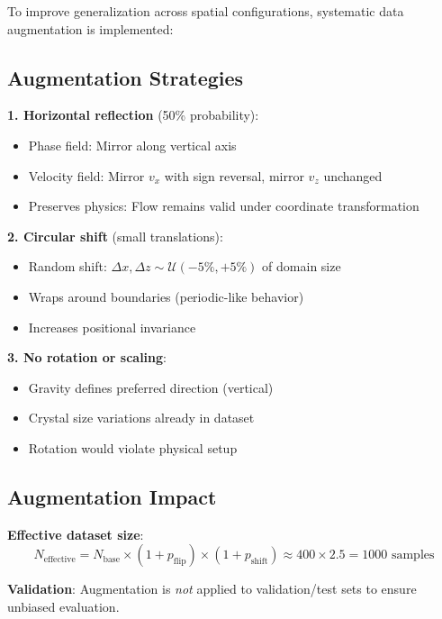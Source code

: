 To improve generalization across spatial configurations, systematic data augmentation is implemented:

\subsection{Augmentation Strategies}

\textbf{1. Horizontal reflection} (50\% probability):
\begin{itemize}
    \item Phase field: Mirror along vertical axis
    \item Velocity field: Mirror $v_x$ with sign reversal, mirror $v_z$ unchanged
    \item Preserves physics: Flow remains valid under coordinate transformation
\end{itemize}

\textbf{2. Circular shift} (small translations):
\begin{itemize}
    \item Random shift: $\Delta x, \Delta z \sim \mathcal{U}(-5\%, +5\%)$ of domain size
    \item Wraps around boundaries (periodic-like behavior)
    \item Increases positional invariance
\end{itemize}

\textbf{3. No rotation or scaling}:
\begin{itemize}
    \item Gravity defines preferred direction (vertical)
    \item Crystal size variations already in dataset
    \item Rotation would violate physical setup
\end{itemize}

\subsection{Augmentation Impact}

\textbf{Effective dataset size}: 
\begin{equation}
N_{\text{effective}} = N_{\text{base}} \times (1 + p_{\text{flip}}) \times (1 + p_{\text{shift}}) \approx 400 \times 2.5 = 1000 \text{ samples}
\end{equation}

\textbf{Validation}: Augmentation is \textit{not} applied to validation/test sets to ensure unbiased evaluation.

